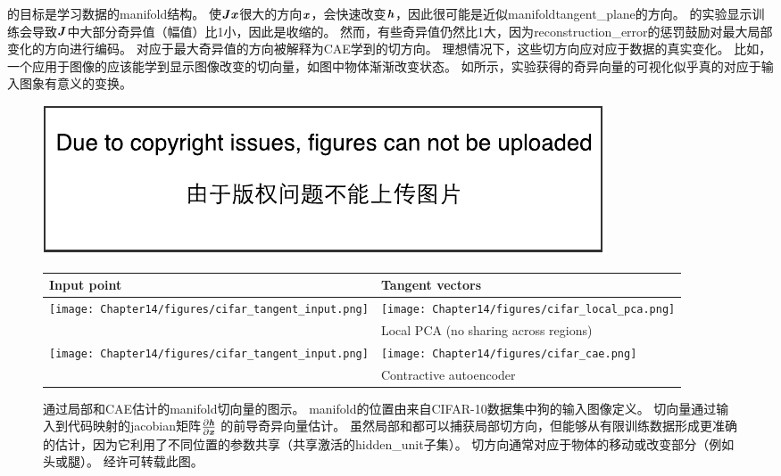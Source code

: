 的目标是学习数据的\gls{manifold}结构。
使$\boldsymbol{\mathit{J}}\boldsymbol{\mathit{x}}$很大的方向$\boldsymbol{\mathit{x}}$，会快速改变$\boldsymbol{\mathit{h}}$，因此很可能是近似\gls{manifold}\gls{tangent_plane}的方向。
\citet{Rifai+al-2011-small,Salah+al-2011-small}的实验显示训练会导致$\boldsymbol{\mathit{J}}$中大部分奇异值（幅值）比1小，因此是收缩的。
然而，有些奇异值仍然比1大，因为\gls{reconstruction_error}的惩罚鼓励对最大局部变化的方向进行编码。
对应于最大奇异值的方向被解释为\gls{CAE}学到的切方向。
理想情况下，这些切方向应对应于数据的真实变化。
比如，一个应用于图像的应该能学到显示图像改变的切向量，如图中物体渐渐改变状态。
如所示，实验获得的奇异向量的可视化似乎真的对应于输入图象有意义的变换。


\begin{figure}[ht]
\centering
\ifOpenSource
\centerline{\includegraphics{figure.pdf}}
\else
\begin{tabular}{p{.1\figwidth}|p{.86\figwidth}}
Input point & Tangent vectors\\
\hline 
\texttt{[image: Chapter14/figures/cifar\_tangent\_input.png]} & 
\texttt{[image: Chapter14/figures/cifar\_local\_pca.png]}\\
 & Local PCA (no sharing across regions)\\
 \hline
\texttt{[image: Chapter14/figures/cifar\_tangent\_input.png]} & 
\texttt{[image: Chapter14/figures/cifar\_cae.png]}\\
 & Contractive autoencoder\\
\end{tabular}
\fi
\caption{通过局部和\gls{CAE}估计的\gls{manifold}切向量的图示。
\gls{manifold}的位置由来自CIFAR-10数据集中狗的输入图像定义。
切向量通过输入到代码映射的\gls{jacobian}矩阵$\frac{\partial \boldsymbol{\mathit{h}}}{\partial \boldsymbol{\mathit{x}}}$ 的前导奇异向量估计。
虽然局部和都可以捕获局部切方向，但能够从有限训练数据形成更准确的估计，因为它利用了不同位置的参数共享（共享激活的\gls{hidden_unit}子集）。
切方向通常对应于物体的移动或改变部分（例如头或腿）。
经\citet{Dauphin-et-al-NIPS2011-small}许可转载此图。
}
\label{fig:chap14_cifar_cae}
\end{figure}


